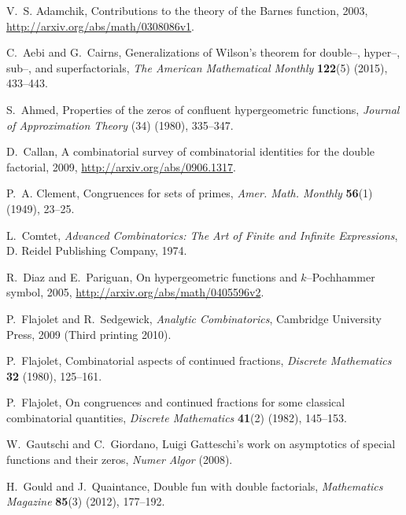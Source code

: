 \documentclass[12pt,reqno]{article}
\numberwithin{sfootnote}{section}
\numberwithin{equation}{section}
\theoremstyle{DefaultTheoremStyle}
\theoremstyle{definition}
\begin{document}
\begin{thebibliography}{10}

V.~S. Adamchik, Contributions to the theory of the {B}arnes function, 2003, 
\url{http://arxiv.org/abs/math/0308086v1}. 

C.~Aebi and G.~Cairns, Generalizations of {W}ilson's theorem for
  double--, hyper--, sub--, and superfactorials, {\em The American Mathematical
  Monthly} {\bf 122}(5) (2015), 433--443.

S.~Ahmed, Properties of the zeros of confluent hypergeometric functions, {\em
  Journal of Approximation Theory} (34) (1980), 335--347.

D.~Callan, A combinatorial survey of combinatorial identities for the 
double factorial, 2009, \url{http://arxiv.org/abs/0906.1317}. 

P.~A. Clement, Congruences for sets of primes, {\em Amer. Math. Monthly} {\bf
  56}(1) (1949), 23--25.

L.~Comtet, {\em Advanced Combinatorics: The Art of Finite and Infinite
  Expressions}, D. Reidel Publishing Company, 1974.

R.~Diaz and E.~Pariguan, 
On hypergeometric functions and $k$--{P}ochhammer symbol, 2005, 
\url{http://arxiv.org/abs/math/0405596v2}. 

P.~Flajolet and R.~Sedgewick, {\em Analytic Combinatorics}, Cambridge
  University Press, 2009 (Third printing 2010).

P.~Flajolet, Combinatorial aspects of continued fractions, {\em Discrete
  Mathematics} {\bf 32} (1980), 125--161.

P.~Flajolet, On congruences and continued fractions for some classical
  combinatorial quantities, {\em Discrete Mathematics} {\bf 41}(2) (1982),
  145--153.

W.~Gautschi and C.~Giordano, {L}uigi {G}atteschi's work on asymptotics of
  special functions and their zeros, {\em Numer Algor}  (2008).

H.~Gould and J.~Quaintance, Double fun with double factorials, {\em
  Mathematics Magazine} {\bf 85}(3) (2012), 177--192.


\end{thebibliography}
\end{document}
